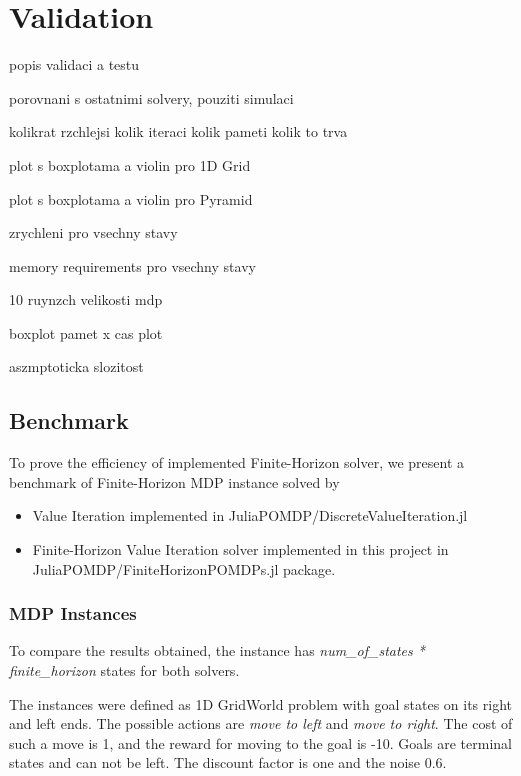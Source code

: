 \chapter{Validation}

popis validaci a testu

porovnani s ostatnimi solvery, pouziti simulaci




kolikrat rzchlejsi  
kolik iteraci
kolik pameti
kolik to trva


plot s boxplotama a violin pro 1D Grid

plot s boxplotama a violin pro Pyramid


zrychleni pro vsechny stavy

memory requirements pro vsechny stavy


10 ruynzch velikosti mdp

boxplot 
pamet x cas plot

aszmptoticka slozitost








\section{Benchmark}
To prove the efficiency of implemented Finite-Horizon solver, we present a benchmark of Finite-Horizon MDP instance solved by
\begin{itemize}
    \item Value Iteration implemented in JuliaPOMDP/DiscreteValueIteration.jl
    \item Finite-Horizon Value Iteration solver implemented in this project in JuliaPOMDP/FiniteHorizonPOMDPs.jl package.
\end{itemize}

\subsection{MDP Instances}

To compare the results obtained, the instance has \textit{num\_of\_states * finite\_horizon} states for both solvers.

The instances were defined as 1D GridWorld problem with goal states on its right and left ends. The possible actions are \textit{move to left} and \textit{move to right}. The cost of such a move is 1, and the reward for moving to the goal is -10. Goals are terminal states and can not be left. The discount factor is one and the noise 0.6.

